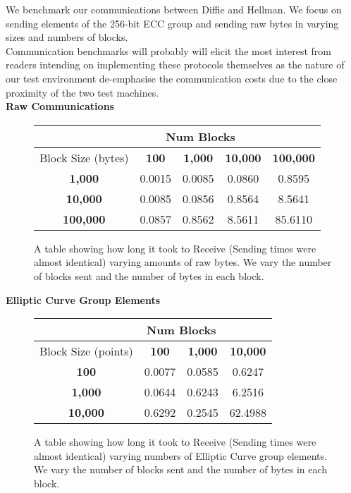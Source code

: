 \documentclass[ %
                    author={Nicholas Tutte},
                supervisor={Prof. Nigel Smart},
                    degree={MEng},
                     title={Secure Two Party Computation},
                  subtitle={A practical comparison of recent protocols},
                      type={Research - GG1K},
                      year={2015} ]{dissertation}
\begin{document}
\begin{appendices}
				We benchmark our communications between Diffie and Hellman. We focus on sending elements of the 256-bit ECC group and sending raw bytes in varying sizes and numbers of blocks.\\

				Communication benchmarks will probably will elicit the most interest from readers intending on implementing these protocols themselves as the nature of our test environment de-emphasise the communication costs due to the close proximity of the two test machines.\\

				\textbf{Raw Communications}
				\begin{figure}[!ht]
					\begin{tabular}{| c || c | c | c | c | }
						\hline
						& \multicolumn{3}{c}{Num Blocks} & \\
						\hline
						Block Size (bytes) & \textbf{100} & \textbf{1,000} & \textbf{10,000} & \textbf{100,000} \\
						\hline
						\hline
						\textbf{1,000} 	& 0.0015 & 0.0085 & 0.0860 & 0.8595\\
						\hline
						\textbf{10,000} 	& 0.0085 & 0.0856 & 0.8564 & 8.5641\\
						\hline
						\textbf{100,000} 	& 0.0857 & 0.8562 & 8.5611 & 85.6110\\
						\hline
					\end{tabular}
					\caption{A table showing how long it took to Receive (Sending times were almost identical) varying amounts of raw bytes. We vary the number of blocks sent and the number of bytes in each block. \label{fig:RawCommsBenchmark}}
				\end{figure}

				\textbf{Elliptic Curve Group Elements}
				\begin{figure}[!ht]
					\begin{tabular}{| c || c | c | c | }
						\hline
						& \multicolumn{2}{c}{Num Blocks} & \\
						\hline
						Block Size (points) & \textbf{100} & \textbf{1,000} & \textbf{10,000} \\
						\hline
						\hline
						\textbf{100} 	& 0.0077 & 0.0585 & 0.6247 \\
						\hline
						\textbf{1,000} & 0.0644 & 0.6243 & 6.2516 \\
						\hline
						\textbf{10,000} & 0.6292 & 0.2545 & 62.4988 \\
						\hline
					\end{tabular}
					\caption{A table showing how long it took to Receive (Sending times were almost identical) varying numbers of Elliptic Curve group elements. We vary the number of blocks sent and the number of bytes in each block. \label{fig:GroupElemsCommsBenchmark}}
				\end{figure}



\end{appendices}
\end{document}
